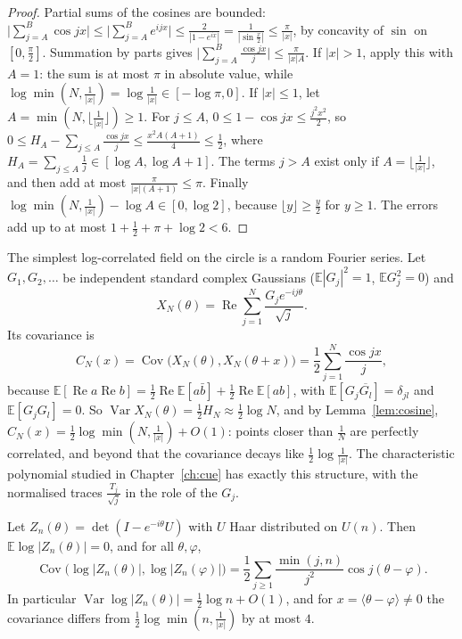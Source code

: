 \begin{proof}
Partial sums of the cosines are bounded: $\bigl|\sum_{j=A}^B\cos jx\bigr|\le\bigl|\sum_{j=A}^Be^{ijx}\bigr|\le\frac2{|1-e^{ix}|}=\frac1{|\sin\frac x2|}\le\frac\pi{|x|}$, by concavity of $\sin$ on $[0,\frac\pi2]$. Summation by parts
gives $\bigl|\sum_{j=A}^B\frac{\cos jx}j\bigr|\le\frac\pi{|x|A}$. If $|x|>1$, apply this with $A=1$: the sum is at most $\pi$ in absolute value, while $\log\min(N,\frac1{|x|})=\log\frac1{|x|}\in[-\log\pi,0]$. If $|x|\le1$, let
$A=\min(N,\lfloor\frac1{|x|}\rfloor)\ge1$. For $j\le A$, $0\le1-\cos jx\le\frac{j^2x^2}2$, so $0\le H_A-\sum_{j\le A}\frac{\cos jx}j\le\frac{x^2A(A+1)}4\le\frac12$, where $H_A=\sum_{j\le A}\frac1j\in[\log A,\log A+1]$. The terms $j>A$ exist only if
$A=\lfloor\frac1{|x|}\rfloor$, and then add at most $\frac\pi{|x|(A+1)}\le\pi$. Finally $\log\min(N,\frac1{|x|})-\log A\in[0,\log2]$, because $\lfloor y\rfloor\ge\frac y2$ for $y\ge1$. The errors add up to at most $1+\frac12+\pi+\log2<6$.
\end{proof}

The simplest log-correlated field on the circle is a random Fourier series. Let $G_1,G_2,\dots$ be independent standard complex Gaussians ($\mathbb E|G_j|^2=1$, $\mathbb EG_j^2=0$) and
\begin{equation}\label{eq:fourierfield}
X_N(\theta)=\operatorname{Re}\sum_{j=1}^N\frac{G_je^{-ij\theta}}{\sqrt j}.
\end{equation}
Its covariance is
\[
C_N(x)=\operatorname{Cov}\bigl(X_N(\theta),X_N(\theta+x)\bigr)=\frac12\sum_{j=1}^N\frac{\cos jx}j,
\]
because $\mathbb E[\operatorname{Re}a\operatorname{Re}b]=\frac12\operatorname{Re}\mathbb E[a\bar b]+\frac12\operatorname{Re}\mathbb E[ab]$, with $\mathbb E[G_j\overline{G_l}]=\delta_{jl}$ and $\mathbb E[G_jG_l]=0$. So $\operatorname{Var}X_N(\theta)=\frac12H_N\approx\frac12\log N$, and by Lemma~\ref{lem:cosine},
$C_N(x)=\frac12\log\min(N,\frac1{|x|})+O(1)$: points closer than $\frac1N$ are perfectly correlated, and beyond that the covariance decays like $\frac12\log\frac1{|x|}$. The characteristic polynomial studied in Chapter~\ref{ch:cue} has exactly this structure,
with the normalised traces $\frac{T_j}{\sqrt j}$ in the role of the $G_j$.

\begin{proposition}\label{prop:cuelogcorr}
Let $Z_n(\theta)=\det(I-e^{-i\theta}U)$ with $U$ Haar distributed on $U(n)$. Then $\mathbb E\log|Z_n(\theta)|=0$, and for all $\theta,\varphi$,
\[
\operatorname{Cov}\bigl(\log|Z_n(\theta)|,\log|Z_n(\varphi)|\bigr)=\frac12\sum_{j\ge1}\frac{\min(j,n)}{j^2}\cos j(\theta-\varphi).
\]
In particular $\operatorname{Var}\log|Z_n(\theta)|=\frac12\log n+O(1)$, and for $x=\langle\theta-\varphi\rangle\ne0$ the covariance differs from $\frac12\log\min(n,\frac1{|x|})$ by at most $4$.
\end{proposition}

